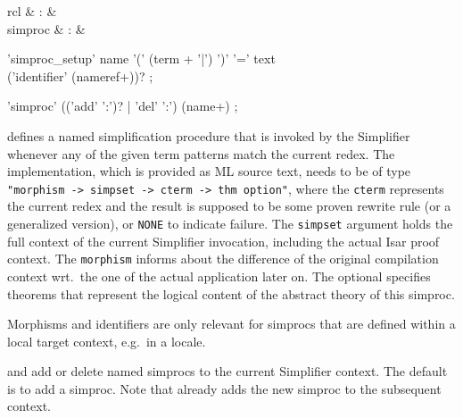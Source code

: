 \begin{isabellebody}
\begin{isamarkuptext}
\begin{descr}
  \end{descr}%
\end{isamarkuptext}%
\isamarkuptrue%
%
\isamarkuptrue%
%
\begin{isamarkuptext}%
\begin{matharray}{rcl}
    \mbox{} & : &  \\
    simproc & : & \isaratt \\
  \end{matharray}

  \begin{rail}
    'simproc\_setup' name '(' (term + '|') ')' '=' text \\ ('identifier' (nameref+))?
    ;

    'simproc' (('add' ':')? | 'del' ':') (name+)
    ;
  \end{rail}

  \begin{descr}

  \item [\mbox{\isa{\isacommand{simproc{\isacharunderscore}setup}}}] defines a named simplification
  procedure that is invoked by the Simplifier whenever any of the
  given term patterns match the current redex.  The implementation,
  which is provided as ML source text, needs to be of type \verb|"morphism -> simpset -> cterm -> thm option"|, where the \verb|cterm| represents the current redex  and the result is
  supposed to be some proven rewrite rule  (or a
  generalized version), or \verb|NONE| to indicate failure.  The
  \verb|simpset| argument holds the full context of the current
  Simplifier invocation, including the actual Isar proof context.  The
  \verb|morphism| informs about the difference of the original
  compilation context wrt.\ the one of the actual application later
  on.  The optional \mbox{} specifies theorems that
  represent the logical content of the abstract theory of this
  simproc.

  Morphisms and identifiers are only relevant for simprocs that are
  defined within a local target context, e.g.\ in a locale.

  \item [\isa{{\isachardoublequote}simproc\ add{\isacharcolon}\ name{\isachardoublequote}} and \isa{{\isachardoublequote}simproc\ del{\isacharcolon}\ name{\isachardoublequote}}]
  add or delete named simprocs to the current Simplifier context.  The
  default is to add a simproc.  Note that \mbox{}
  already adds the new simproc to the subsequent context.


\end{descr}
\end{isamarkuptext}
\end{isabellebody}
